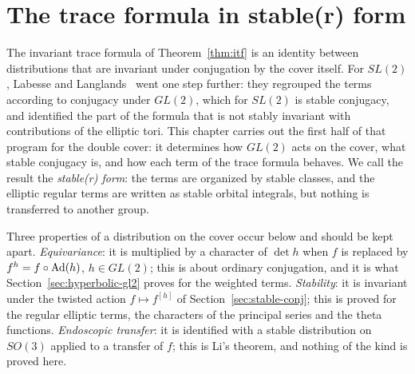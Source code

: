 %
%

\providecommand{\GA}{\overline{G(\A)}}
\providecommand{\GS}{\overline{G(\Q_S)}}
\providecommand{\AS}{\overline{A(\Q_S)}}
\providecommand{\KS}{\overline{K_S}}
\providecommand{\Gb}{\overline{SL(2,F)}}

\chapter{The trace formula in stable(r) form}\label{sec:stable}

The invariant trace formula of Theorem~\ref{thm:itf} is an identity
between distributions that are invariant under conjugation by the cover
itself. For $SL(2)$, Labesse and Langlands~\cite{LL79} went one step
further: they regrouped the terms according to conjugacy under $GL(2)$,
which for $SL(2)$ is stable conjugacy, and identified the part of the
formula that is not stably invariant with contributions of the elliptic
tori. This chapter carries out the first half of that program for the
double cover: it determines how $GL(2)$ acts on the cover, what stable
conjugacy is, and how each term of the trace formula behaves. We call the
result the \emph{stable(r) form}: the terms are organized by stable
classes, and the elliptic regular terms are written as stable orbital
integrals, but nothing is transferred to another group.

Three properties of a distribution on the cover occur below and should be
kept apart. \emph{Equivariance}: it is multiplied by a character of $\det
h$ when $f$ is replaced by $f^h=f\circ\operatorname{Ad}(h)$, $h\in GL(2)$; this
is about ordinary conjugation, and it is what
Section~\ref{sec:hyperbolic-gl2} proves for the weighted terms.
\emph{Stability}: it is invariant under the twisted action $f\mapsto
f^{[h]}$ of Section~\ref{sec:stable-conj}; this is proved for the regular
elliptic terms, the characters of the principal series and the theta
functions. \emph{Endoscopic transfer}: it is identified with a stable
distribution on $SO(3)$ applied to a transfer of $f$; this is Li's
theorem, and nothing of the kind is proved here.

